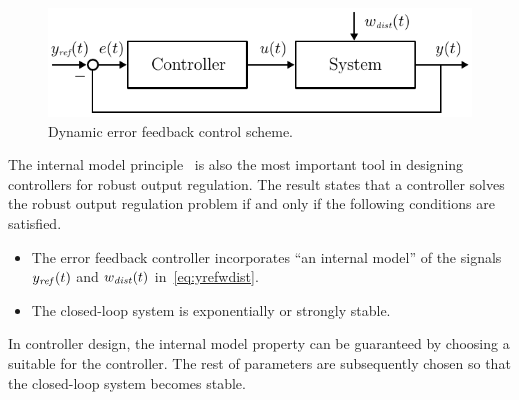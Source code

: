 \documentclass[11pt, a4paper]{amsart}
\theoremstyle{definition}
\numberwithin{equation}{section}
\newcommand{\yref}{y_{\mbox{\scriptsize\textit{ref}}}}
\newcommand{\wdist}{w_{\mbox{\scriptsize\textit{dist}}}}
\begin{document}
\begin{figure}[h!]
  \begin{center}
    \includegraphics[width=.75\linewidth]{FB-control-scheme-horizontal-slim-notation} 
    \caption{Dynamic error feedback control scheme.}
    \label{fig:FBcontrol}
  \end{center}
\end{figure}

The internal model principle~\cite[Thm. 6.9]{PauPoh10} is also the most important tool in designing controllers for robust output regulation. The result states that a controller solves the robust output regulation problem if and only if the following conditions are satisfied.
\begin{itemize}
  \item The error feedback controller incorporates ``an internal model'' of
    the signals $\yref(t)$ and $\wdist(t)$ in~\eqref{eq:yrefwdist}.
  \item The closed-loop system is exponentially or strongly stable.
\end{itemize}
In controller design, the internal model property can be guaranteed by choosing a suitable  for the controller. The rest of parameters are subsequently chosen so that the closed-loop system becomes stable.
\end{document}
